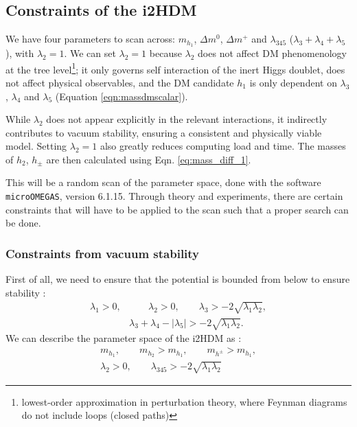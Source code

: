 \documentclass[12pt]{article}
\begin{document}
\subsection{Constraints of the i2HDM}
We have four parameters to scan across: $m_{h_1}$, $\Delta m^0$, $\Delta m^+$ and $\lambda_{345}$ ($\lambda_3 + \lambda_4 + \lambda_5$), with $\lambda_2 = 1$. We can set $\lambda_2 = 1$ because $\lambda_2$ does not affect DM phenomenology at the tree level\footnote{lowest-order approximation in perturbation theory, where Feynman diagrams do not include loops (closed paths)}\cite{Belyaev:2016lok}; it only governs self interaction of the inert Higgs doublet, does not affect physical observables, and the DM candidate $h_1$ is only dependent on $\lambda_3$, $\lambda_4$ and $\lambda_5$ (Equation \ref{eqn:massdmscalar}). 

While $\lambda_2$ does not appear explicitly in the relevant interactions, it indirectly contributes to vacuum stability, ensuring a consistent and physically viable model. Setting $\lambda_2 = 1$ also greatly reduces computing load and time. The masses of $h_2$, $h_\pm$ are then calculated using Eqn. \ref{eq:mass_diff_1}.

This will be a random scan of the parameter space, done with the software \verb|microOMEGAS|, version 6.1.15. Through theory and experiments, there are certain constraints that will have to be applied to the scan such that a proper search can be done.

\subsubsection{Constraints from vacuum stability}
First of all, we need to ensure that the potential is bounded from below to ensure stability \cite{Deshpande:1977rw}:
\begin{equation}
    \begin{split}
    \lambda_1>0,& \qquad
    \lambda_2>0, \qquad
    \lambda_3> -2 \sqrt{ \lambda_1 \lambda_2}, \\
    &\lambda_3 + \lambda_4 - |\lambda_5| > -2 \sqrt{ \lambda_1 \lambda_2}.
    \end{split}
    \label{eq:potential_stability}
\end{equation}
We can describe the parameter space of the i2HDM as \cite{Belyaev:2016lok}:
\begin{equation}
    \begin{split}
        m_{h_1}, \qquad m_{h_2} > m_{h_1}, \qquad m_{h^\pm} > m_{h_1}, \\
        \lambda_2 > 0, \qquad \lambda_{345} > -2\sqrt{\lambda_1 \lambda_2}
    \end{split}
\end{equation}
\end{document}
